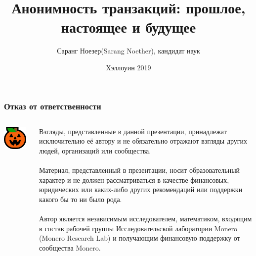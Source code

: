 \documentclass[aspectratio=169]{beamer}
\title[Анонимность транзакций: прошлое, настоящее и будущее]{Анонимность транзакций: прошлое, \\ настоящее и будущее}
\author{Саранг Ноезер(Sarang Noether), кандидат наук}
\date{Хэллоуин 2019}
\institute{World Crypto Con, Лас-Вегас}
\begin{document}
\begin{frame}[plain]
\maketitle
\end{frame}


\begin{frame}
\frametitle{Отказ от ответственности}
\begin{columns}
\begin{column}{0.2\textwidth}
\includegraphics[width=0.9\textwidth]{icon-jack.png}
\end{column}
\begin{column}{0.8\textwidth}
Взгляды, представленные в данной презентации, принадлежат исключительно её автору и не обязательно отражают взгляды других людей, организаций или сообщества. \\~\\

Материал, представленный в презентации, носит образовательный характер и не должен рассматриваться в качестве финансовых, юридических или каких-либо других рекомендаций или поддержки какого бы то ни было рода. \\~\\

Автор является независимым исследователем, математиком, входящим в состав рабочей группы Исследовательской лаборатории Monero (Monero Research Lab) и получающим финансовую поддержку от сообщества Monero.
\end{column}
\end{columns}
\end{frame}
\end{document}
